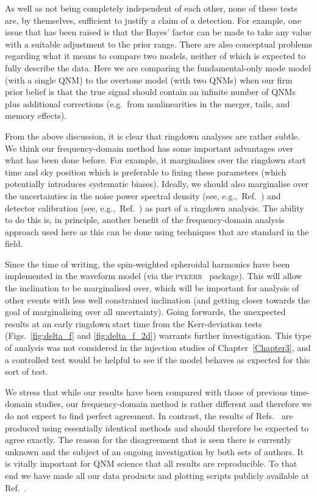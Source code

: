 As well as not being completely independent of each other, none of these tests are, by themselves, sufficient to justify a claim of a detection.
For example, one issue that has been raised is that the Bayes' factor can be made to take any value with a suitable adjustment to the prior range.
There are also conceptual problems regarding what it means to compare two models, neither of which is expected to fully describe the data. Here we are comparing the fundamental-only mode model (with a single QNM) to the overtone model (with two QNMs) when our firm prior belief is that the true signal should contain an infinite number of QNMs plus additional corrections (e.g.\ from nonlinearities in the merger, tails, and memory effects).

From the above discussion, it is clear that ringdown analyses are rather subtle. 
We think our frequency-domain method has some important advantages over what has been done before. 
For example, it marginalises over the ringdown start time and sky position which is preferable to fixing these parameters (which potentially introduces systematic biases). 
Ideally, we should also marginalise over the uncertainties in the noise power spectral density (see, e.g.,\ Ref.~\cite{Cornish:2020dwh}) and detector calibration (see, e.g.,\ Ref.~\cite{LIGOScientific:2017aaj}) as part of a ringdown analysis. 
The ability to do this is, in principle, another benefit of the frequency-domain analysis approach used here as this can be done using techniques that are standard in the field.

Since the time of writing, the spin-weighted spheroidal harmonics have been implemented in the waveform model (via the \textsc{pykerr}~\cite{pykerr} package).
This will allow the inclination to be marginalised over, which will be important for analysis of other events with less well constrained inclination (and getting closer towards the goal of marginalising over all uncertainty).
Going forwards, the unexpected results at an early ringdown start time from the Kerr-deviation tests (Figs.~\ref{fig:delta_f} and \ref{fig:delta_f_2d}) warrants further investigation.
This type of analysis was not considered in the injection studies of Chapter~\ref{Chapter3}, and a controlled test would be helpful to see if the model behaves as expected for this sort of test. 

We stress that while our results have been compared with those of previous time-domain studies, our frequency-domain method is rather different and therefore we do not expect to find perfect agreement. 
In contrast, the results of Refs.~\cite{Isi:2019aib, Cotesta:2022pci, Isi:2022mhy} are produced using essentially identical methods and should therefore be expected to agree exactly. 
The reason for the disagreement that is seen there is currently unknown and the subject of an ongoing investigation by both sets of authors.
It is vitally important for QNM science that all results are reproducible. To that end we have made all our data products and plotting scripts publicly available at Ref.~\cite{finch_eliot_2022_6949492}.

